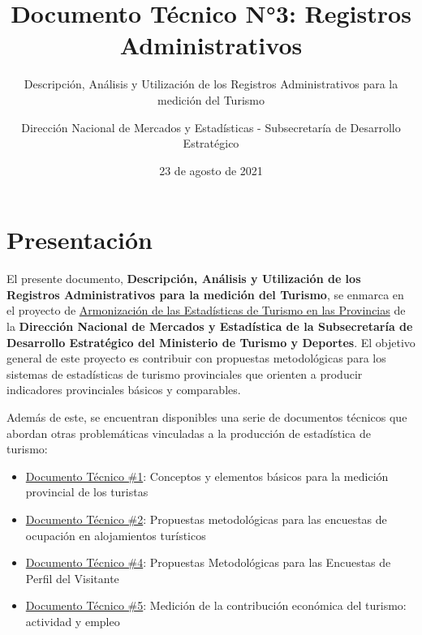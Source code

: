 \documentclass[
]{book}
\title{Documento Técnico N°3: Registros Administrativos}
\subtitle{Descripción, Análisis y Utilización de los Registros Administrativos para la medición del Turismo}
\author{Dirección Nacional de Mercados y Estadísticas - Subsecretaría de Desarrollo Estratégico}
\date{23 de agosto de 2021}
\let\oldmaketitle\maketitle
\begin{document}
\maketitle


\newpage

\let\maketitle\oldmaketitle
\maketitle

{
\setcounter{tocdepth}{1}
\tableofcontents
}
\hypertarget{presentaciuxf3n}{%
\chapter*{Presentación}\label{presentaciuxf3n}}

El presente documento, \textbf{Descripción, Análisis y Utilización de los Registros Administrativos para la medición del Turismo}, se enmarca en el proyecto de \href{https://armonizacion.yvera.tur.ar//}{Armonización de las Estadísticas de Turismo en las Provincias} de la \textbf{Dirección Nacional de Mercados y Estadística de la Subsecretaría de Desarrollo Estratégico del Ministerio de Turismo y Deportes}. El objetivo general de este proyecto es contribuir con propuestas metodológicas para los sistemas de estadísticas de turismo provinciales que orienten a producir indicadores provinciales básicos y comparables.

Además de este, se encuentran disponibles una serie de documentos técnicos que abordan otras problemáticas vinculadas a la producción de estadística de turismo:

\begin{itemize}
\item
  \href{https://dnme-minturdep.github.io/DT1_medicion_turismo/}{Documento Técnico \#1}: Conceptos y elementos básicos para la medición provincial de los turistas
\item
  \href{https://dnme-minturdep.github.io/DT2_encuestas/}{Documento Técnico \#2}: Propuestas metodológicas para las encuestas de ocupación en alojamientos turísticos
\item
  \href{https://dnme-minturdep.github.io/DT4_perfiles/}{Documento Técnico \#4}: Propuestas Metodológicas para las Encuestas de Perfil del Visitante
\item
  \href{https://dnme-minturdep.github.io/DT5_actividad_empleo/}{Documento Técnico \#5}: Medición de la contribución económica del turismo: actividad y empleo
\end{itemize}
\end{document}
